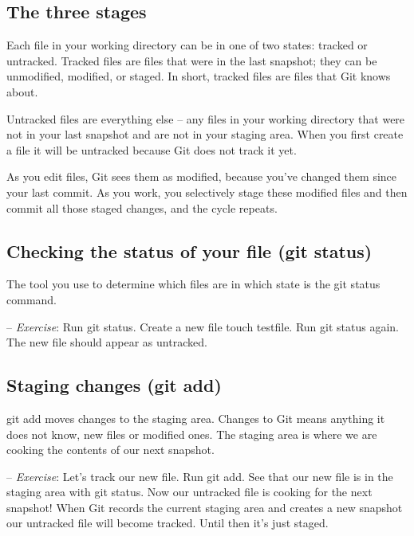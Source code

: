 \documentclass[12pt,a4]{article}
\newcommand{\ilcode}[1]{\textcolor[RGB]{160, 110, 220}{#1}}
\begin{document}
\subsection{The three stages}
\begin{center}
\end{center}

Each file in your working directory can be in one of two states: tracked or
untracked. Tracked files are files that were in the last snapshot; they can be
unmodified, modified, or staged. In short, tracked files are files that Git
knows about.

Untracked files are everything else -- any files in your working directory that
were not in your last snapshot and are not in your staging area. When you first
create a file it will be untracked because Git does not track it yet.

As you edit files, Git sees them as modified, because you’ve changed them since
your last commit. As you work, you selectively stage these modified files and
then commit all those staged changes, and the cycle repeats.

\subsection{Checking the status of your file (git status)}
The tool you use to determine which files are in which state is the \ilcode{git
status} command.

{\sf -- \emph{Exercise}:} Run \ilcode{git status}. Create a new file
\ilcode{touch testfile}. Run \ilcode{git status} again. The new file should
appear as \ilcode{untracked}.

\subsection{Staging changes (git add)}
\ilcode{git add} moves changes to the staging area. Changes to Git means
anything it does not know, new files or modified ones. The staging area is where
we are cooking the contents of our next snapshot.

{\sf -- \emph{Exercise}:} Let's track our new file. Run \ilcode{git add}. See
that our new file is in the staging area with \ilcode{git status}. Now our
untracked file is cooking for the next snapshot! When Git records the current
staging area and creates a new snapshot our untracked file will become tracked.
Until then it's just staged.
\end{document}
